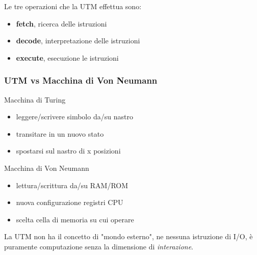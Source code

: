 Le tre operazioni che la UTM effettua sono:
\begin{itemize}
    \item \textbf{fetch}, ricerca delle istruzioni
    \item \textbf{decode}, interpretazione delle istruzioni
    \item \textbf{execute}, esecuzione le istruzioni
\end{itemize}

\subsubsection{UTM vs Macchina di Von Neumann}

\begin{multicols}{2}
    \noindent
    Macchina di Turing
    \begin{itemize}
        \item leggere/scrivere simbolo da/su nastro
        \item transitare in un nuovo stato
        \item spostarsi sul nastro di x posizioni
    \end{itemize}
    \columnbreak
    \begin{mdframed}[topline=false,bottomline=false,rightline=false] 
        Macchina di Von Neumann
        \begin{itemize}
            \item lettura/scrittura da/su RAM/ROM
            \item nuova configurazione registri CPU
            \item scelta cella di memoria su cui operare
        \end{itemize}
    \end{mdframed}
\end{multicols}

La UTM non ha il concetto di "mondo esterno", ne nessuna istruzione di I/O, è puramente computazione senza la dimensione di \textit{interazione}.

